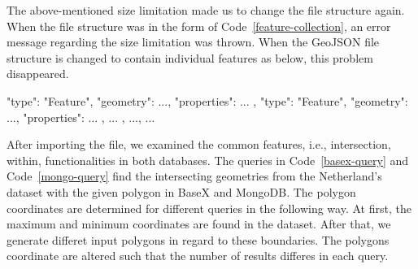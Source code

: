 \documentclass[a4paper,12pt]{article}
\begin{document}
The above-mentioned size limitation made us to change the file structure again.
When the file structure was in the form of Code~\ref{feature-collection}, 
an error message regarding the size limitation was thrown. 
When the GeoJSON file structure is changed to contain individual features as below,
this problem disappeared.
\vspace{10px}
\begin{fakeXML}[label=features,caption=A GeoJSON file restructured regarding the size limitation]
    {
      "type": "Feature",
      "geometry": {...},
      "properties": {...}
    },
    {
      "type": "Feature",
      "geometry": {...},
      "properties": {...}
    }, 
    { ... }, ..., { ... }
\end{fakeXML}
\vspace{10px}
After importing the file, we examined the common features, i.e., intersection, within, 
functionalities in both databases.
The queries in Code~\ref{basex-query} and Code~\ref{mongo-query} find the intersecting geometries from the Netherland's dataset with the given polygon in BaseX and MongoDB. The polygon coordinates are determined for different queries in the following way. At first, the maximum and minimum coordinates are found in the dataset. After that, we generate differet input polygons in regard to these boundaries. The polygons coordinate are altered such that the number of results differes in each query.
\vspace{10px}
\vspace{10px}
\end{document}
